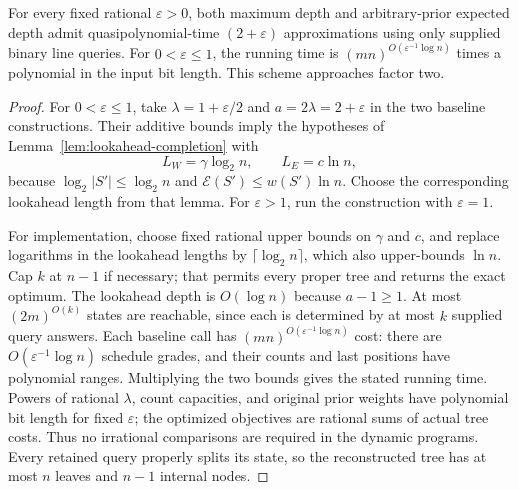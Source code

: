 \begin{theorem}\label{thm:qp-two-plus-epsilon}
For every fixed rational $\varepsilon>0$, both maximum depth and
arbitrary-prior expected depth admit quasipolynomial-time
$(2+\varepsilon)$ approximations using only supplied binary line
queries. For $0<\varepsilon\le1$, the running time is
$(mn)^{O(\varepsilon^{-1}\log n)}$ times a polynomial in the input
bit length. This scheme approaches factor two.
\end{theorem}
\begin{proof}
For $0<\varepsilon\le1$, take $\lambda=1+\varepsilon/2$ and
$a=2\lambda=2+\varepsilon$ in the two baseline constructions.
Their additive bounds imply the hypotheses of
Lemma~\ref{lem:lookahead-completion} with
\[
 L_W=\gamma\log_2n,\qquad L_E=c\ln n,
\]
because $\log_2|S'|\le\log_2n$ and
$\mathcal E(S')\le w(S')\ln n$. Choose the corresponding lookahead
length from that lemma. For $\varepsilon>1$, run the construction
with $\varepsilon=1$.

For implementation, choose fixed rational upper bounds on $\gamma$
and $c$, and replace logarithms in the lookahead lengths by
$\lceil\log_2 n\rceil$, which also upper-bounds $\ln n$.
Cap $k$ at $n-1$ if necessary; that permits every proper tree and
returns the exact optimum. The lookahead depth is $O(\log n)$
because $a-1\ge1$. At most $(2m)^{O(k)}$ states are reachable,
since each is determined by at most $k$ supplied query answers.
Each baseline call has $(mn)^{O(\varepsilon^{-1}\log n)}$ cost:
there are $O(\varepsilon^{-1}\log n)$ schedule grades, and their
counts and last positions have polynomial ranges. Multiplying the
two bounds gives the stated running time. Powers of rational
$\lambda$, count
capacities, and original prior weights have polynomial bit length
for fixed $\varepsilon$; the optimized objectives are rational
sums of actual tree costs. Thus no irrational comparisons are
required in the dynamic programs.
Every retained query properly splits its state, so the reconstructed
tree has at most $n$ leaves and $n-1$ internal nodes.
\end{proof}
